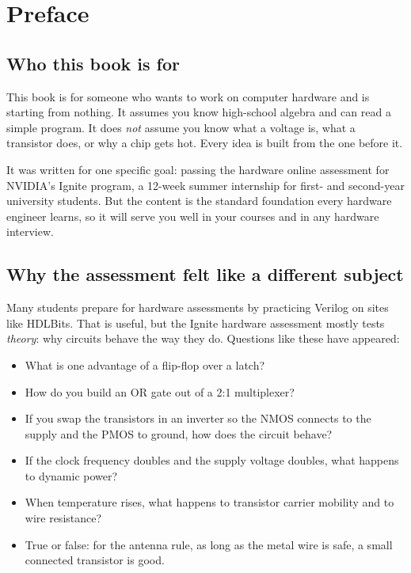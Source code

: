 \chapter{Preface}

\section*{Who this book is for}

This book is for someone who wants to work on computer hardware and is starting from nothing. It assumes you know high-school algebra and can read a simple program. It does \emph{not} assume you know what a voltage is, what a transistor does, or why a chip gets hot. Every idea is built from the one before it.

It was written for one specific goal: passing the hardware online assessment for NVIDIA's Ignite program, a 12-week summer internship for first- and second-year university students. But the content is the standard foundation every hardware engineer learns, so it will serve you well in your courses and in any hardware interview.

\section*{Why the assessment felt like a different subject}

Many students prepare for hardware assessments by practicing Verilog on sites like HDLBits. That is useful, but the Ignite hardware assessment mostly tests \emph{theory}: why circuits behave the way they do. Questions like these have appeared:

\begin{itemize}
  \item What is one advantage of a flip-flop over a latch?
  \item How do you build an OR gate out of a 2:1 multiplexer?
  \item If you swap the transistors in an inverter so the NMOS connects to the supply and the PMOS to ground, how does the circuit behave?
  \item If the clock frequency doubles and the supply voltage doubles, what happens to dynamic power?
  \item When temperature rises, what happens to transistor carrier mobility and to wire resistance?
  \item True or false: for the antenna rule, as long as the metal wire is safe, a small connected transistor is good.
\end{itemize}

